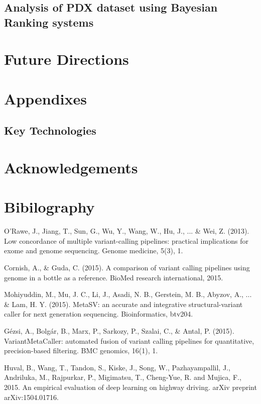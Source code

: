 \documentclass{article}
\begin{document}
\subsection{Analysis of PDX dataset using Bayesian Ranking systems}

\section{Future Directions}


\section{Appendixes}
\subsection{Key Technologies}


\section{Acknowledgements}

\section{Bibilography}

\begin{thebibliography}{9}
O'Rawe, J., Jiang, T., Sun, G., Wu, Y., Wang, W., Hu, J., ... \& Wei, Z. (2013). Low concordance of multiple variant-calling pipelines: practical implications for exome and genome sequencing. Genome medicine, 5(3), 1.
 
 Cornish, A., \& Guda, C. (2015). A comparison of variant calling pipelines using genome in a bottle as a reference. BioMed research international, 2015.

Mohiyuddin, M., Mu, J. C., Li, J., Asadi, N. B., Gerstein, M. B., Abyzov, A., ... \& Lam, H. Y. (2015). MetaSV: an accurate and integrative structural-variant caller for next generation sequencing. Bioinformatics, btv204.

Gézsi, A., Bolgár, B., Marx, P., Sarkozy, P., Szalai, C., \& Antal, P. (2015). VariantMetaCaller: automated fusion of variant calling pipelines for quantitative, precision-based filtering. BMC genomics, 16(1), 1.

Huval, B., Wang, T., Tandon, S., Kiske, J., Song, W., Pazhayampallil, J., Andriluka, M., Rajpurkar, P., Migimatsu, T., Cheng-Yue, R. and Mujica, F., 2015. An empirical evaluation of deep learning on highway driving. arXiv preprint arXiv:1504.01716.

\end{thebibliography}
\end{document}
